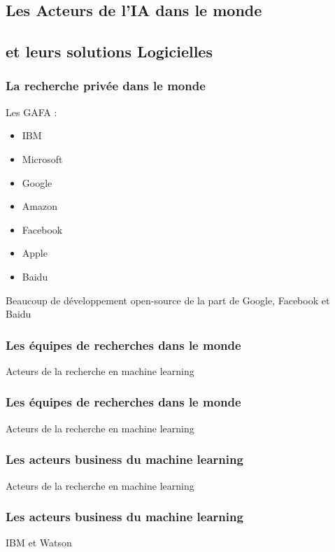 \subsection{Les Acteurs de l'IA dans le monde}
\subsection{et leurs solutions Logicielles}

\begin{frame}
  \frametitle{La recherche privée dans le monde}
  Les GAFA :
  \begin{itemize}
  \item IBM
  \item Microsoft
  \item Google
  \item Amazon
  \item Facebook
  \item Apple
  \item Baidu
  \end{itemize}
  Beaucoup de développement open-source de la part de Google, Facebook et Baidu
\end{frame}

\begin{frame}
  \frametitle{Les équipes de recherches dans le monde}
  Acteurs de la recherche en machine learning
\end{frame}

\begin{frame}
  \frametitle{Les équipes de recherches dans le monde}
  Acteurs de la recherche en machine learning
\end{frame}

\begin{frame}
  \frametitle{Les acteurs business du machine learning}
  Acteurs de la recherche en machine learning
\end{frame}

\begin{frame}
  \frametitle{Les acteurs business du machine learning}
  IBM et Watson
\end{frame}

